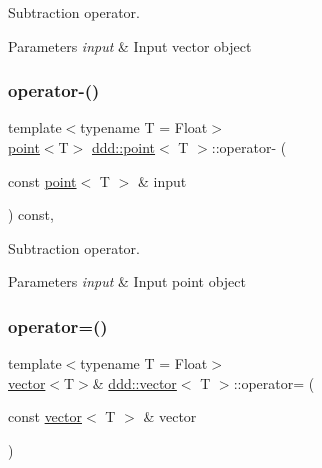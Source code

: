 Subtraction operator. 


\begin{DoxyParams}{Parameters}
{\em input} & Input vector object \\
\hline
\end{DoxyParams}
\mbox{\label{classddd_1_1point_a5621f5a883c88d5588e09f9ff0de6575}} 
\subsubsection{\texorpdfstring{operator-\/()}{operator-()}\hspace{0.1cm}{\footnotesize\ttfamily [2/2]}}
{\footnotesize\ttfamily template$<$typename T = Float$>$ \\
\hyperlink{classddd_1_1point}{point}$<$T$>$ \hyperlink{classddd_1_1point}{ddd\+::point}$<$ T $>$\+::operator-\/ (\begin{DoxyParamCaption}\item[{const \hyperlink{classddd_1_1point}{point}$<$ T $>$ \&}]{input }\end{DoxyParamCaption}) const\hspace{0.3cm}{\ttfamily [inline]}, {\ttfamily [inherited]}}



Subtraction operator. 


\begin{DoxyParams}{Parameters}
{\em input} & Input point object \\
\hline
\end{DoxyParams}
\mbox{\label{classddd_1_1vector_a873d3b0fd4d4a5d7a1b6a9d7e907009d}} 
\subsubsection{\texorpdfstring{operator=()}{operator=()}}
{\footnotesize\ttfamily template$<$typename T = Float$>$ \\
\hyperlink{classddd_1_1vector}{vector}$<$T$>$\& \hyperlink{classddd_1_1vector}{ddd\+::vector}$<$ T $>$\+::operator= (\begin{DoxyParamCaption}\item[{const \hyperlink{classddd_1_1vector}{vector}$<$ T $>$ \&}]{vector }\end{DoxyParamCaption})\hspace{0.3cm}{\ttfamily [inline]}}



